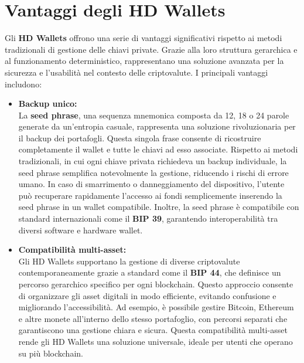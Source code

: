 \documentclass{article}
\begin{document}
\section{Vantaggi degli HD Wallets}
Gli \textbf{HD Wallets} offrono una serie di vantaggi significativi rispetto ai metodi tradizionali di gestione delle chiavi private. Grazie alla loro struttura gerarchica e al funzionamento deterministico, rappresentano una soluzione avanzata per la sicurezza e l'usabilità nel contesto delle criptovalute. I principali vantaggi includono:

\begin{itemize}
    \item \textbf{Backup unico:} \\
    La \textbf{seed phrase}, una sequenza mnemonica composta da 12, 18 o 24 parole generate da un'entropia casuale, rappresenta una soluzione rivoluzionaria per il backup dei portafogli. Questa singola frase consente di ricostruire completamente il wallet e tutte le chiavi ad esso associate. Rispetto ai metodi tradizionali, in cui ogni chiave privata richiedeva un backup individuale, la seed phrase semplifica notevolmente la gestione, riducendo i rischi di errore umano. In caso di smarrimento o danneggiamento del dispositivo, l'utente può recuperare rapidamente l'accesso ai fondi semplicemente inserendo la seed phrase in un wallet compatibile. Inoltre, la seed phrase è compatibile con standard internazionali come il \textbf{BIP 39}, garantendo interoperabilità tra diversi software e hardware wallet.\vspace{0.5em}

    \item \textbf{Compatibilità multi-asset:} \\
    Gli HD Wallets supportano la gestione di diverse criptovalute contemporaneamente grazie a standard come il \textbf{BIP 44}, che definisce un percorso gerarchico specifico per ogni blockchain. Questo approccio consente di organizzare gli asset digitali in modo efficiente, evitando confusione e migliorando l'accessibilità. Ad esempio, è possibile gestire Bitcoin, Ethereum e altre monete all'interno dello stesso portafoglio, con percorsi separati che garantiscono una gestione chiara e sicura. Questa compatibilità multi-asset rende gli HD Wallets una soluzione universale, ideale per utenti che operano su più blockchain.\vspace{0.5em}


\end{itemize}
\end{document}
